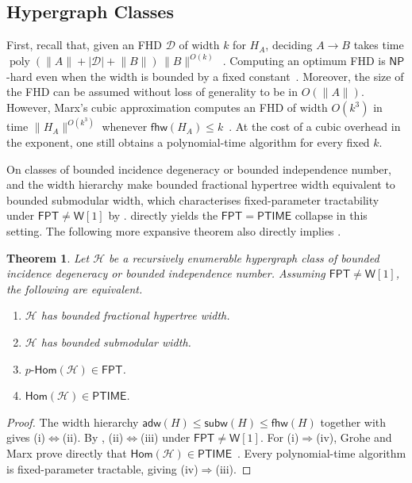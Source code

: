 \documentclass[11pt,letterpaper]{article}
\newtheorem{theorem}{Theorem}[section]
\theoremstyle{definition}
\theoremstyle{remark}
\newcommand{\cH}{\mathcal H}
\newcommand{\Hom}{\mathsf{Hom}}
\newcommand{\pHom}{p\text{-}\mathsf{Hom}}
\newcommand{\fhw}{\mathsf{fhw}}
\newcommand{\adw}{\mathsf{adw}}
\newcommand{\subw}{\mathsf{subw}}
\newcommand{\FPT}{\ensuremath{\mathsf{FPT}}}
\newcommand{\PTIME}{\mathsf{PTIME}}
\newcommand{\NP}{\mathsf{NP}}
\newcommand{\wone}{\ensuremath{\mathsf{W}[1]}}
\providecommand{\adw}{\operatorname{adw}}
\providecommand{\subw}{\operatorname{subw}}
\providecommand{\fhw}{\operatorname{fhw}}
\providecommand{\FPT}{\ensuremath{\mathsf{FPT}}}
\providecommand{\PTIME}{\mathsf{PTIME}}
\begin{document}
\subsection{Hypergraph Classes}

First, recall that, given an FHD $\mathcal D$ of width $k$ for $H_A$, deciding $A\to B$
takes time
$\operatorname{poly}(\lVert A\rVert+|\mathcal D|+\lVert B\rVert)\,\lVert B\rVert^{O(k)}$~\cite{fhw}. Computing an optimum FHD is $\NP$-hard even when the width is bounded by a fixed constant~\cite{DBLP:journals/jacm/GottlobLPR21}. Moreover, the size of the FHD can be assumed without loss of generality to be in $O(\lVert A \rVert)$. However, Marx's cubic approximation computes an FHD of width $O(k^3)$ in time $\lVert H_A\rVert^{O(k^3)}$ whenever $\fhw(H_A)\le k$~\cite[Theorem~4.1]{MarxFHW2010}. At the cost of a cubic overhead in the exponent, one still obtains a polynomial-time algorithm for every fixed $k$.


On classes of bounded incidence degeneracy or bounded independence number, 
and the width hierarchy make bounded fractional hypertree width equivalent
to bounded submodular width, which characterises fixed-parameter
tractability under $\FPT\ne \wone$ by .  directly yields the $\FPT=\PTIME$ collapse in this setting. The following more expansive theorem also directly implies .



\begin{theorem}
\label{thm:bounded-lambda-collapse}
Let $\cH$ be a recursively enumerable hypergraph class of bounded incidence degeneracy or bounded independence number. Assuming $\FPT\ne \wone$, the following are equivalent.
\begin{enumerate}[label=(\roman*)]
 \item $\cH$ has bounded fractional hypertree width.
 \item $\cH$ has bounded submodular width.
 \item $\pHom(\cH)\in\FPT$.
 \item $\Hom(\cH)\in\PTIME$.
\end{enumerate}
\end{theorem}

\begin{proof}
The width hierarchy $\adw(H)\le\subw(H)\le\fhw(H)$ together with
 gives (i)$\Leftrightarrow$(ii).
By ,
(ii)$\Leftrightarrow$(iii) under $\FPT\ne \wone$.
For (i)$\Rightarrow$(iv), Grohe and Marx prove directly that
$\Hom(\cH)\in\PTIME$~\cite[Corollary~4.11]{fhw}.
Every polynomial-time algorithm is fixed-parameter tractable, giving
(iv)$\Rightarrow$(iii).
\end{proof}
\end{document}
